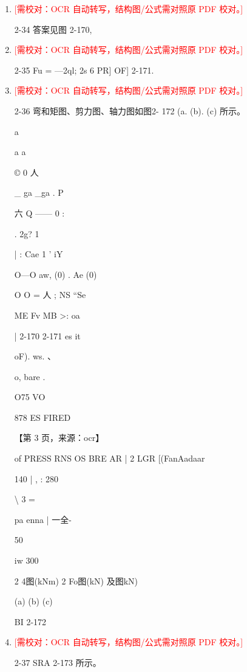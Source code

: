 \documentclass[UTF8,12pt,a4paper,openany]{ctexbook}
\newcommand{\TODO}[1]{\textcolor{red}{[需校对：#1]}}
\begin{document}
\begin{enumerate}[label=\textbf{\arabic*.},leftmargin=2em]
\item \TODO{OCR 自动转写，结构图/公式需对照原 PDF 校对。}\par 2-34 答案见图 2-170,
\item \TODO{OCR 自动转写，结构图/公式需对照原 PDF 校对。}\par 2-35  Fu = —2ql; 2s 6 PR] OF] 2-171.
\item \TODO{OCR 自动转写，结构图/公式需对照原 PDF 校对。}\par 2-36 弯和矩图、剪力图、轴力图如图2- 172 (a. (b). (c) 所示。\par a\par a    a\par ©   0   人\par \_ ga        \_ga             .       P\par 六       Q              ——  0          :\par . 2g?     1\par |                           :              Cae 1 ' iY\par O—O                    aw,                                          (0)  . Ae  (0)\par O                           O    =   人 ;            NS  “Se\par ME Fv                        MB                   >:         oa\par | 2-170 2-171                         es         it\par oF).  ws. 、\par o, bare .\par O75 VO\par 878 ES FIRED\par \par 【第 3 页，来源：ocr】\par of PRESS RNS OS BRE AR | 2 LGR [(FanAadaar\par 140 |       ,                           :        280\par \textbackslash{}                   3                                  =\par pa enna       |       一全-\par 50\par iw           300\par 2      4图(kNm)              2      Fo图(kN)     及图kN)\par (a)                           (b)                       (c)\par BI 2-172
\item \TODO{OCR 自动转写，结构图/公式需对照原 PDF 校对。}\par 2-37 SRA 2-173 所示。

\end{enumerate}
\end{document}

